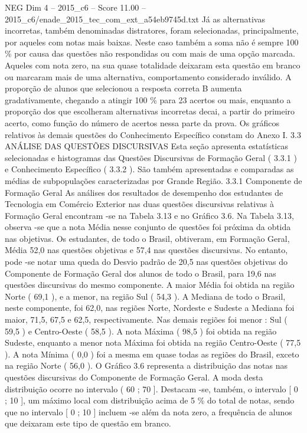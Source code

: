 \begin{textsample}{NEG Dim 4 – 2015\_c6 – Score 11.00 – 2015\_c6/enade\_2015\_tec\_com\_ext\_a54eb9745d.txt}
Já as alternativas incorretas, também denominadas distratores, foram selecionadas, principalmente, por aqueles com notas mais baixas.
Neste caso também a soma não é sempre 100 \% por causa das questões não respondidas ou com mais de uma opção marcada.
Aqueles com nota zero, na sua quase totalidade deixaram esta questão em branco ou marcaram mais de uma alternativa, comportamento considerado inválido.
A proporção de alunos que selecionou a resposta correta B aumenta gradativamente, chegando a atingir 100 \% para 23 acertos ou mais, enquanto a proporção dos que escolheram alternativas incorretas decai, a partir do primeiro acerto, como função do número de acertos nessa parte da prova.
Os gráficos relativos às demais questões do Conhecimento Específico constam do Anexo I. 3.3 ANÁLISE DAS QUESTÕES DISCURSIVAS Esta seção apresenta estatísticas selecionadas e histogramas das Questões Discursivas de Formação Geral ( 3.3.1 ) e Conhecimento Específico ( 3.3.2 ).
São também apresentadas e comparadas as médias de subpopulações caracterizadas por Grande Região. 3.3.1 Componente de Formação Geral As análises dos resultados de desempenho dos estudantes de Tecnologia em Comércio Exterior nas duas questões discursivas relativas à Formação Geral encontram -se na Tabela 3.13 e no Gráfico 3.6.
Na Tabela 3.13, observa -se que a nota Média nesse conjunto de questões foi próxima da obtida nas objetivas.
Os estudantes, de todo o Brasil, obtiveram, em Formação Geral, Média 52,0 nas questões objetivas e 57,4 nas questões discursivas.
No entanto, pode -se notar uma queda do Desvio padrão de 20,5 nas questões objetivas do Componente de Formação Geral dos alunos de todo o Brasil, para 19,6 nas questões discursivas do mesmo componente.
A maior Média foi obtida na região Norte ( 69,1 ), e a menor, na região Sul ( 54,3 ).
A Mediana de todo o Brasil, neste componente, foi 62,0, nas regiões Norte, Nordeste e Sudeste a Mediana foi maior, 71,5, 67,5 e 62,5, respectivamente.
Nas demais regiões foi menor : Sul ( 59,5 ) e Centro-Oeste ( 58,5 ).
A nota Máxima ( 98,5 ) foi obtida na região Sudeste, enquanto a menor nota Máxima foi obtida na região Centro-Oeste ( 77,5 ).
A nota Mínima ( 0,0 ) foi a mesma em quase todas as regiões do Brasil, exceto na região Norte ( 56,0 ).
O Gráfico 3.6 representa a distribuição das notas nas questões discursivas do Componente de Formação Geral.
A moda desta distribuição ocorre no intervalo ( 60 ; 70 ].
Destacam -se, também, o intervalo [ 0 ; 10 ], um máximo local com distribuição acima de 5 \% do total de notas, sendo que no intervalo [ 0 ; 10 ] incluem -se além da nota zero, a frequência de alunos que deixaram este tipo de questão em branco.

\end{textsample}
